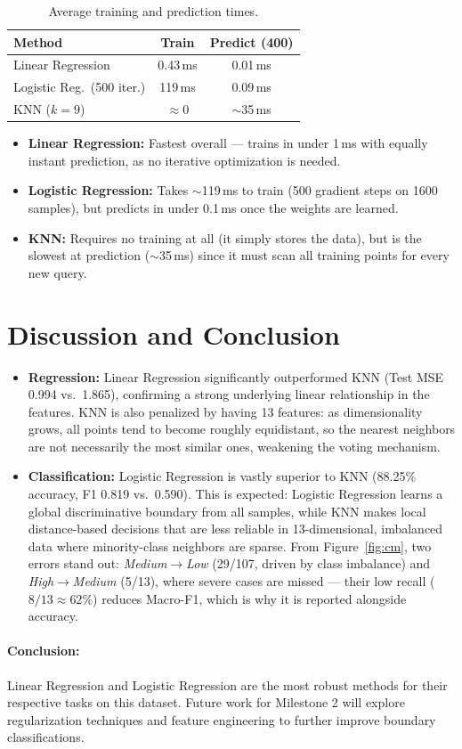 \documentclass[10pt, twocolumn, letterpaper]{article}
\begin{document}
\begin{table}[H]
\centering
\caption{Average training and prediction times.}
\label{tab:runtime}
\setlength{\tabcolsep}{4pt}
\begin{tabular}{@{}lcc@{}}
\toprule
\textbf{Method} & \textbf{Train} & \textbf{Predict (400)} \\
\midrule
Linear Regression          & 0.43\,ms  & 0.01\,ms \\
Logistic Reg.\ (500 iter.) & 119\,ms   & 0.09\,ms \\
KNN ($k{=}9$)              & $\approx$0 & $\sim$35\,ms \\
\bottomrule
\end{tabular}
\end{table}

\begin{itemize}[noitemsep, leftmargin=*]
    \item \textbf{Linear Regression:} Fastest overall — trains in under 1\,ms with equally instant prediction, as no iterative optimization is needed.
    \item \textbf{Logistic Regression:} Takes $\sim$119\,ms to train (500 gradient steps on 1600 samples), but predicts in under 0.1\,ms once the weights are learned.
    \item \textbf{KNN:} Requires no training at all (it simply stores the data), but is the slowest at prediction ($\sim$35\,ms) since it must scan all training points for every new query.
\end{itemize}

\section{Discussion and Conclusion}
\begin{itemize}[leftmargin=*]
    \item \textbf{Regression:} Linear Regression significantly outperformed KNN (Test MSE 0.994 vs.\ 1.865), confirming a strong underlying linear relationship in the features. KNN is also penalized by having 13 features: as dimensionality grows, all points tend to become roughly equidistant, so the nearest neighbors are not necessarily the most similar ones, weakening the voting mechanism.
    \item \textbf{Classification:} Logistic Regression is vastly superior to KNN (88.25\% accuracy, F1 0.819 vs.\ 0.590). This is expected: Logistic Regression learns a global discriminative boundary from all samples, while KNN makes local distance-based decisions that are less reliable in 13-dimensional, imbalanced data where minority-class neighbors are sparse. From Figure~\ref{fig:cm}, two errors stand out: \emph{Medium}$\to$\emph{Low} (29/107, driven by class imbalance) and \emph{High}$\to$\emph{Medium} (5/13), where severe cases are missed --- their low recall ($8/13 \approx 62\%$) reduces Macro-F1, which is why it is reported alongside accuracy.
\end{itemize}

\paragraph{Conclusion:} Linear Regression and Logistic Regression are the most robust methods for their respective tasks on this dataset. Future work for Milestone 2 will explore regularization techniques and feature engineering to further improve boundary classifications.
\end{document}
